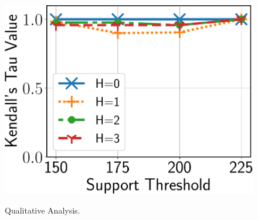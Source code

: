 {\begin{figure}[t!]
{\includegraphics[keepaspectratio,scale=0.24, angle=0]{img2/citeseer/citeseer_kt.pdf}
\label{fig:citeseer_kt}
}
\vspace{-2mm}
\caption{\scriptsize Qualitative Analysis.}
\label{fig:quality}
\vspace{-2mm}
\end{figure}
}

